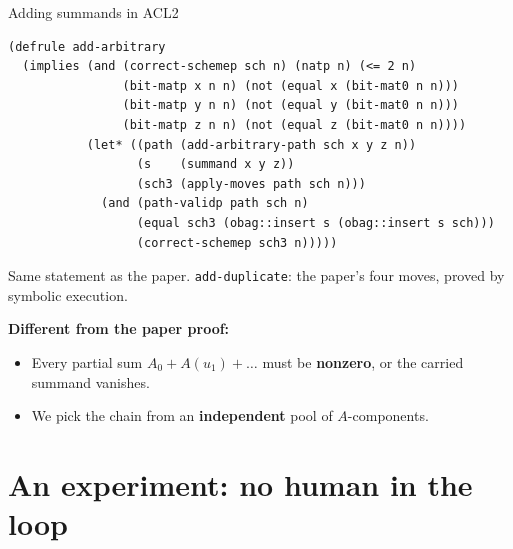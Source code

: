 \documentclass[aspectratio=169,10pt]{beamer}
\newcommand{\code}[1]{\texttt{#1}}
\newcommand{\diff}[1]{\textcolor{red!70!black}{\textbf{Different from the paper proof:}} #1}
\begin{document}
\begin{frame}[fragile]{Adding summands in ACL2}
\begin{lstlisting}
(defrule add-arbitrary
  (implies (and (correct-schemep sch n) (natp n) (<= 2 n)
                (bit-matp x n n) (not (equal x (bit-mat0 n n)))
                (bit-matp y n n) (not (equal y (bit-mat0 n n)))
                (bit-matp z n n) (not (equal z (bit-mat0 n n))))
           (let* ((path (add-arbitrary-path sch x y z n))
                  (s    (summand x y z))
                  (sch3 (apply-moves path sch n)))
             (and (path-validp path sch n)
                  (equal sch3 (obag::insert s (obag::insert s sch)))
                  (correct-schemep sch3 n)))))
\end{lstlisting}
  Same statement as the paper. \code{add-duplicate}: the paper's four
  moves, proved by symbolic execution.

  \diff{}
  \begin{itemize}
    \item Every partial sum $A_0 + A(u_1) + \dots$ must be \textbf{nonzero},
      or the carried summand vanishes.
    \item We pick the chain from an \textbf{independent} pool of
      $A$-components.
  \end{itemize}
\end{frame}

\section{An experiment: no human in the loop}
\end{document}

